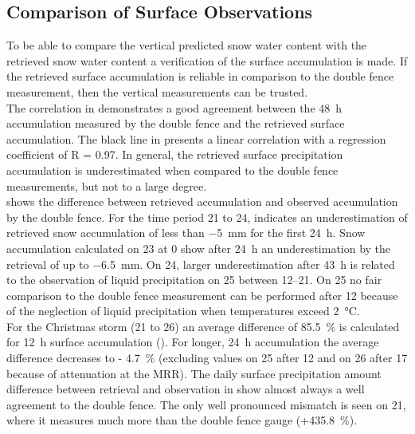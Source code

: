 \subsection{Comparison of Surface Observations} \label{sec:ret_dofe_comp}
To be able to compare the vertical predicted snow water content with the retrieved snow water content a verification of the surface accumulation is made. If the retrieved surface accumulation is reliable in comparison to the double fence measurement, then the vertical measurements can be trusted.
\\
The correlation in  demonstrates a good agreement between the \SI{48}{\hour} accumulation measured by the double fence and the retrieved surface accumulation.
The black line in  presents a linear correlation with a regression coefficient of R = \num{0.97}. 
In general, the retrieved surface precipitation accumulation is underestimated when compared to the double fence measurements, but not to a large degree. 
\\
 shows the difference between retrieved accumulation and observed accumulation by the double fence. For the time period \num{21} to \SI{24}{\dec},  indicates an underestimation of retrieved snow accumulation of less than \SI{-5}{\mm} for the first \SI{24}{\hour}. 
Snow accumulation calculated on \SI{23}{\dec} at \SI{0}{\UTC} show after \SI{24}{\hour} an underestimation by the retrieval of up to \SI{-6.5}{\mm}. On \SI{24}{\dec}, larger underestimation after \SI{43}{\hour} is related to the observation of liquid precipitation on \SI{25}{\dec} between \SIrange{12}{21}{\UTC}. On \SI{25}{\dec} no fair comparison to the double fence measurement can be performed after \SI{12}{\UTC} because of the neglection of liquid precipitation when temperatures exceed \SI{2}{\celsius}.
\\
For the Christmas storm (\num{21} to \SI{26}{\dec}) an average difference of \SI{85.5}{\percent} is calculated for \SI{12}{\hour} surface accumulation %
(). For longer, \SI{24}{\hour} accumulation the average difference decreases to \SI{- 4.7}{\percent} (excluding values on \SI{25}{\dec} after \SI{12}{\UTC} and on \SI{26}{\dec} after \SI{17}{\UTC} because of attenuation at the MRR). The daily surface precipitation amount difference between retrieval and observation in  show almost always a well agreement to the double fence. The only well pronounced mismatch is seen on \SI{21}{\dec}, where it measures much more than the double fence gauge (+\SI{435.8}{\percent}).
